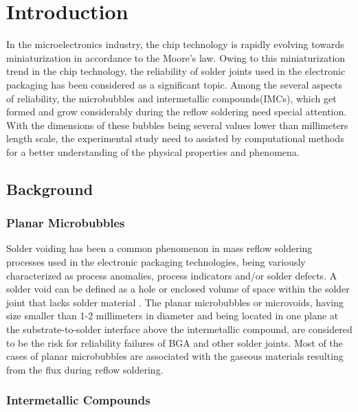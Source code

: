 \chapter{Introduction}\label{Chap1}
In the microelectronics industry, the chip technology is rapidly evolving towards miniaturization in accordance to the Moore's law. Owing to this miniaturization trend in the chip technology, the reliability of solder joints used in the electronic packaging has been considered as a significant topic.  Among the several aspects of reliability, the microbubbles and intermetallic compounds(IMCs), which get formed and grow considerably during the reflow soldering need special attention. With the dimensions of these bubbles being several values lower than millimeters length scale, the experimental study need to assisted by computational methods for a better understanding of the physical properties and phenomena.

\section{Background}\label{Chap1_01}

\subsection{Planar Microbubbles} \label{Chap1_01_01}
Solder voiding has been a common phenomenon in mass reflow soldering processes used in the electronic packaging technologies, being variously characterized as process anomalies, process indicators and/or solder defects. A solder void can be defined as a hole or enclosed volume of space within the solder joint that lacks solder material \cite{TLLewis:2012}. The planar microbubbles or microvoids, having size smaller than 1-2 millimeters in diameter and being located in one plane at the substrate-to-solder interface above the intermetallic compound, are considered to be the risk for reliability failures of BGA and other solder joints. Most of the cases of planar microbubbles are associated with the gaseous materials resulting from the flux during reflow soldering.

\subsection{Intermetallic Compounds} \label{Chap1_01_02}




